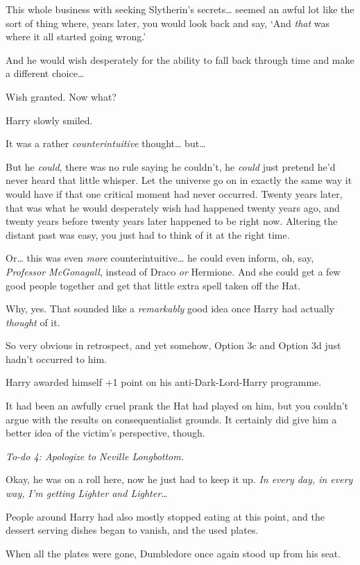 This whole business with seeking Slytherin's secrets{\ldots} seemed an awful lot like the sort of thing where, years later, you would look back and say, `And \emph{that} was where it all started going wrong.'

And he would wish desperately for the ability to fall back through time and make a different choice{\ldots}

Wish granted. Now what?

Harry slowly smiled.

It was a rather \emph{counterintuitive} thought{\ldots} but{\ldots}

But he \emph{could}, there was no rule saying he couldn't, he \emph{could} just pretend he'd never heard that little whisper. Let the universe go on in exactly the same way it would have if that one critical moment had never occurred. Twenty years later, that was what he would desperately wish had happened twenty years ago, and twenty years before twenty years later happened to be right now. Altering the distant past was easy, you just had to think of it at the right time.

Or{\ldots} this was even \emph{more} counterintuitive{\ldots} he could even inform, oh, say, \emph{Professor McGonagall}, instead of Draco \emph{or} Hermione. And she could get a few good people together and get that little extra spell taken off the Hat.

Why, yes. That sounded like a \emph{remarkably} good idea once Harry had actually \emph{thought} of it.

So very obvious in retrospect, and yet somehow, Option 3c and Option 3d just hadn't occurred to him.

Harry awarded himself +1 point on his anti-Dark-Lord-Harry programme.

It had been an awfully cruel prank the Hat had played on him, but you couldn't argue with the results on consequentialist grounds. It certainly did give him a better idea of the victim's perspective, though.

\emph{To-do 4: Apologize to Neville Longbottom.}

Okay, he was on a roll here, now he just had to keep it up. \emph{In every day, in every way, I'm getting Lighter and Lighter{\ldots}}

People around Harry had also mostly stopped eating at this point, and the dessert serving dishes began to vanish, and the used plates.

When all the plates were gone, Dumbledore once again stood up from his seat.

